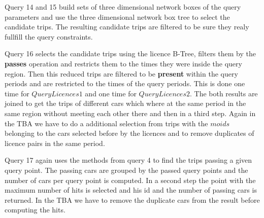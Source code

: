 \documentclass[a4paper]{article}
\newcommand{\op}[1]{\textbf{#1}}
\begin{document}
Query 14 and 15 build sets of three dimensional network boxes of the query parameters
 and use the three dimensional network box tree to select the candidate trips. The
 resulting candidate trips are filtered to be sure they realy fullfill the query
 constraints.

Query 16 selects the candidate trips using the licence B-Tree, filters them by the
 \op{passes} operation and restricts them to the times they were inside the query
 region. Then this reduced trips are filtered to be \op{present} within the query
 periods and are restricted to the times of the query periods. This is done one time
 for $QueryLicences1$ and one time for $QueryLicences2$. The both results are joined
 to get the trips of different cars which where at the same period in the same region
 without meeting each other there and then in a third step. Again in the TBA we have
 to do a additional selection from trips with the $moids$ belonging to the cars
 selected before by the licences and to remove duplicates of licence pairs in the
 same period.

Query 17 again uses the methods from query 4 to find the trips passing a given query
 point. The passing cars are grouped by the passed query points and the number of
 cars per query point is computed. In a second step the point with the maximum number
 of hits is selected and his id and the number of passing cars is returned. In the
 TBA we have to remove the duplicate cars from the result before computing the hits.
\end{document}
